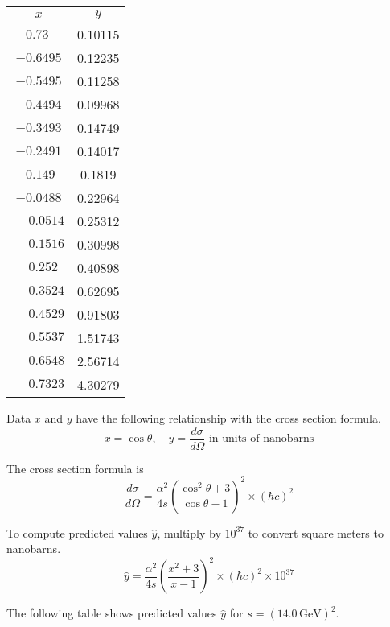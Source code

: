 \documentclass[12pt]{article}
\begin{document}
\begin{center}
\begin{tabular}{|c|c|}
\hline
$x$ & $y$\\
\hline
$-0.73\phantom{00}$ & 0.10115\\
$-0.6495$ & 0.12235\\
$-0.5495$ & 0.11258\\
$-0.4494$ & 0.09968\\
$-0.3493$ & 0.14749\\
$-0.2491$ & 0.14017\\
$-0.149\phantom{0}$ & 0.1819\phantom{0}\\
$-0.0488$ & 0.22964\\
$\phantom{+}0.0514$ & 0.25312\\
$\phantom{+}0.1516$ & 0.30998\\
$\phantom{+}0.252\phantom{0}$ & 0.40898\\
$\phantom{+}0.3524$ & 0.62695\\
$\phantom{+}0.4529$ & 0.91803\\
$\phantom{+}0.5537$ & 1.51743\\
$\phantom{+}0.6548$ & 2.56714\\
$\phantom{+}0.7323$ & 4.30279\\
\hline
\end{tabular}
\end{center}

Data $x$ and $y$ have the following relationship with the cross section formula.
\begin{equation*}
x=\cos\theta,
\quad
y=\frac{d\sigma}{d\Omega}\text{ in units of nanobarns}
\end{equation*}

The cross section formula is
\begin{equation*}
\frac{d\sigma}{d\Omega}
=\frac{\alpha^2}{4s}
\left(\frac{\cos^2\theta+3}{\cos\theta-1}\right)^2\times(\hbar c)^2
\end{equation*}

To compute predicted values $\hat{y}$, multiply by $10^{37}$ to convert square meters to nanobarns.
\begin{equation*}
\hat{y}
=\frac{\alpha^2}{4s}
\left(\frac{x^2+3}{x-1}\right)^2
\times(\hbar c)^2
\times10^{37}
\end{equation*}

The following table shows predicted values $\hat{y}$ for $s=(14.0\,\text{GeV})^2$.
\end{document}

